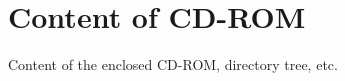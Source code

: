 \chapter{Content of CD-ROM}
\label{chap:appendix_CDROM}

Content of the enclosed CD-ROM, directory tree, etc.
